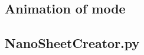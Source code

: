 
\appendix
\appendixpage
\addappheadtotoc
\subsection{Animation of  mode}
\begin{center}
\end{center}
\subsection{NanoSheetCreator.py}
\label{NSCstart}
\inputminted[python3=true,bgcolor=Black,linenos=true]{python}{VNL/PythonScripts/NanoSheetCreator.py}
\label{NSCend}

